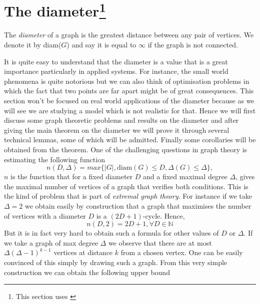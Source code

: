 \section{The diameter\footnote{This section uses \cite{Bollob01}}
}
\begin{definition}
	The \emph{diameter} of a graph is the greatest distance between any pair of vertices. We denote it by diam($G$) and say it is equal to $\infty$ if the graph is not connected.
\end{definition}
It is quite easy to understand that the diameter is a value that is a great importance particularly in applied systems. For instance, the small world phenomena is quite notorious but we can also think of optimisation problems in which the fact that two points are far apart might be of great consequences.
This section won't be focused on real world applications of the diameter because as we will see we are studying a model which is not realistic for that. 
Hence we will first discuss some graph theoretic problems and results on the diameter and after giving the main theorem on the diameter we will prove it through several technical lemmas, some of which will be admitted. Finally some corollaries will be obtained from the theorem.
\newline
One of the challenging questions in graph theory is estimating the following function
\begin{equation}\label{eq:DDeltaProb}
	n(D, \Delta) = max\{ |G|, \text{diam}(G) \leq D, \Delta(G) \leq \Delta\},
\end{equation}
$n$ is the function that for a fixed diameter $D$ and a fixed maximal degree $\Delta$, gives the maximal number of vertices of a graph that verifies both conditions. This is the kind of problem that is part of \emph{extremal graph theory}.
\newline
For instance if we take $\Delta = 2$ we obtain easily by construction that a graph that maximises the number of vertices with a diameter $D$ is a $(2D+1)$-cycle. Hence, 
\begin{equation}
	n(D, 2) = 2D + 1, \forall D \in \mathbb{N}
\end{equation}
But it is in fact very hard to obtain such a formula for other values of $D$ or $\Delta$.
\newline
If we take a graph of max degree $\Delta$ we observe that there are at most $\Delta (\Delta - 1)^{k-1}$ vertices at distance $k$ from a chosen vertex.
One can be easily convinced of this simply by drawing such a graph. 
From this very simple construction we can obtain the following upper bound
